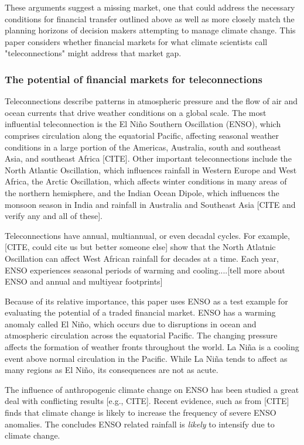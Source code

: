 \documentclass[authoryear]{article}
\begin{document}
These arguments suggest a missing market, one that could address the necessary conditions for financial transfer outlined above as well as more closely match the planning horizons of decision makers attempting to manage climate change. This paper considers whether financial markets for what climate scientists call "teleconnections" might address that market gap.

\subsubsection{The potential of financial markets for teleconnections}
Teleconnections describe patterns in atmospheric pressure and the flow of air and ocean currents that drive weather conditions on a global scale. The most influential teleconnection is the El Niño Southern Oscillation (ENSO), which comprises circulation along the equatorial Pacific, affecting seasonal weather conditions in a large portion of the Americas, Australia, south and southeast Asia, and southeast Africa [CITE]. Other important teleconnections include the North Atlantic Oscillation, which influences rainfall in Western Europe and West Africa, the Arctic Oscillation, which affects winter conditions in many areas of the northern hemisphere, and the Indian Ocean Dipole, which influences the monsoon season in India and rainfall in Australia and Southeast Asia [CITE and verify any and all of these].

Teleconnections have annual, multiannual, or even decadal cycles. For example, [CITE, could cite us but better someone else] show that the North Atlatnic Oscillation can affect West African rainfall for decades at a time. Each year, ENSO experiences seasonal periods of warming and cooling....[tell more about ENSO and annual and multiyear footprints]

Because of its relative importance, this paper uses ENSO as a test example for evaluating the potential of a traded financial market. ENSO has a warming anomaly called El Ni\~no, which occurs due to disruptions in ocean and atmospheric circulation across the equatorial Pacific. The changing pressure affects the formation of weather fronts throughout the world. La Ni\~na is a cooling event above normal circulation in the Pacific. While La Ni\~na tends to affect as many regions as El Ni\~no, its consequences are not as acute.

The influence of anthropogenic climate change on ENSO has been studied a great deal with conflicting results [e.g., CITE]. Recent evidence, such as from [CITE] finds that climate change is likely to increase the frequency of severe ENSO anomalies. The \citet{ipcc2013fifthReport} concludes ENSO related rainfall is \emph{likely} to intensify due to climate change.
\end{document}
